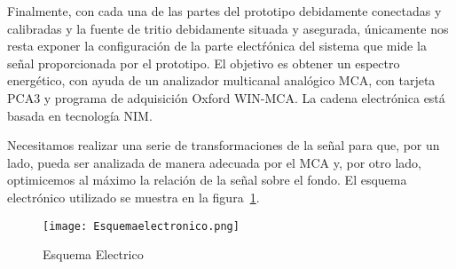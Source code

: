 Finalmente, con cada una de las partes del prototipo debidamente conectadas y calibradas y la fuente de tritio debidamente situada y asegurada, únicamente nos resta exponer la  configuración de la parte electŕónica del sistema que mide la señal proporcionada por el prototipo. El objetivo es obtener un espectro energético, con ayuda de un analizador multicanal analógico MCA, con tarjeta PCA3 y programa de adquisición Oxford WIN-MCA. La cadena electrónica   está basada en  tecnología NIM.

Necesitamos realizar una serie de transformaciones de la señal para que, por un lado,  pueda ser analizada de manera adecuada por el MCA y, por otro lado, optimicemos al máximo la relación de la  señal sobre el fondo. El esquema electrónico utilizado se muestra en la figura~\ref{electronica}.
\begin{figure}[hbtp]
\centering
\texttt{[image: Esquemaelectronico.png]}
\caption{Esquema Electrico~\cite{Andres}\label{electronica}}
\end{figure}
